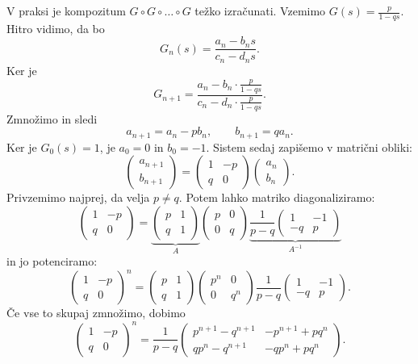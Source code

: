 \documentclass[10pt, a4paper]{article}
\begin{document}
V praksi je kompozitum $G \circ G \circ \dots \circ G$ težko izračunati.
Vzemimo $G(s) = \frac{p}{1 - qs}$. Hitro vidimo, da bo 
$$G_n (s) = \frac{a_n - b_n s}{c_n - d_n s}.$$
Ker je $$G_{n + 1} = \frac{a_n - b_n \cdot\frac{p}{1 - qs}}{c_n - d_n \cdot \frac{p}{1 - qs}}.$$
Zmnožimo in sledi 
$$a_{n + 1} = a_n - pb_n,\qquad b_{n + 1} = q a_n.$$
Ker je $G_0 (s) = 1$, je $a_0 = 0$ in $b_0 = -1$.
Sistem sedaj zapišemo v matrični obliki:
$$\begin{pmatrix}
  a_{n + 1}\\
  b_{n + 1}
\end{pmatrix}
= \begin{pmatrix}
  1 & -p\\
  q & 0
\end{pmatrix} \begin{pmatrix}
  a_n \\ b_n
\end{pmatrix}.$$
Privzemimo najprej, da velja $p \neq q$.
Potem lahko matriko diagonaliziramo:
$$\begin{pmatrix}
  1 & -p\\
  q & 0
\end{pmatrix}
= \underbrace{\begin{pmatrix}
  p & 1\\
  q & 1
\end{pmatrix}}_{A} \begin{pmatrix}
  p & 0\\
  0 & q
\end{pmatrix}
\underbrace{\frac{1}{p - q} \begin{pmatrix}
  1 & -1\\
  -q & p
\end{pmatrix}}_{A^{-1}}
$$
in jo potenciramo:
$$\begin{pmatrix}
  1 & -p\\
  q & 0
\end{pmatrix}^n
= {\begin{pmatrix}
  p & 1\\
  q & 1
\end{pmatrix}} \begin{pmatrix}
  p^n & 0\\
  0 & q^n
\end{pmatrix}
{\frac{1}{p - q} \begin{pmatrix}
  1 & -1\\
  -q & p
\end{pmatrix}}.
$$
Če vse to skupaj zmnožimo, dobimo 
$$\begin{pmatrix}
  1 & -p\\
  q & 0
\end{pmatrix}^n = \frac{1}{p - q} \begin{pmatrix}
  p^{n + 1} - q^{n + 1}& -p^{n + 1} + pq^n\\
  qp^n - q^{n + 1} & -qp^n + pq^n
\end{pmatrix}.$$
\end{document}
